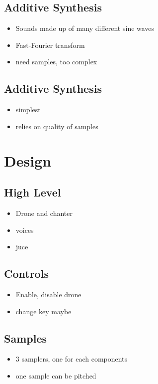 \documentclass{article}
\begin{document}
	\subsection{Additive Synthesis}
	\begin{itemize}
		\item Sounds made up of many different sine waves
		\item Fast-Fourier transform
		\item need samples, too complex
	\end{itemize}
	
	\subsection{Additive Synthesis}
	\begin{itemize}
		\item simplest
		\item relies on quality of samples
	\end{itemize}

	
	\section{Design}
	
	\subsection{High Level}
	\begin{itemize}
		\item Drone and chanter
		\item voices
		\item juce
	\end{itemize}

	\subsection{Controls}
	\begin{itemize}
		\item Enable, disable drone
		\item change key maybe
	\end{itemize}
	
	\subsection{Samples}
	\begin{itemize}
		\item 3 samplers, one for each components
		\item one sample can be pitched
	\end{itemize}
\end{document}
